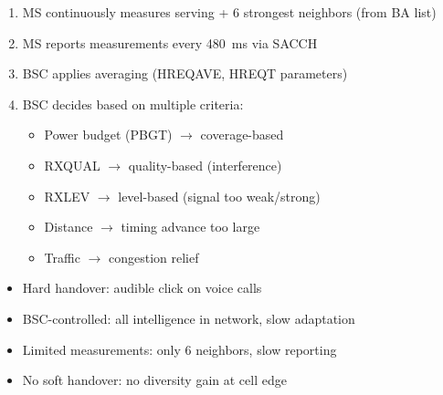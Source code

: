 \begin{enumerate}
\def\labelenumi{\arabic{enumi}.}
\tightlist
\item
  MS continuously measures serving + 6 strongest neighbors (from BA list)
\item
  MS reports measurements every 480~ms via SACCH
\item
  BSC applies averaging (HREQAVE, HREQT parameters)
\item
  BSC decides based on multiple criteria:

  \begin{itemize}
  \tightlist
  \item
    Power budget (PBGT) \ensuremath{\to} coverage-based
  \item
    RXQUAL \ensuremath{\to} quality-based (interference)
  \item
    RXLEV \ensuremath{\to} level-based (signal too weak/\allowbreak{}strong)
  \item
    Distance \ensuremath{\to} timing advance too large
  \item
    Traffic \ensuremath{\to} congestion relief
  \end{itemize}
\end{enumerate}


\begin{itemize}
\tightlist
\item
  Hard handover: audible click on voice calls
\item
  BSC-controlled: all intelligence in network, slow adaptation
\item
  Limited measurements: only 6 neighbors, slow reporting
\item
  No soft handover: no diversity gain at cell edge
\end{itemize}




\CNchained{}




